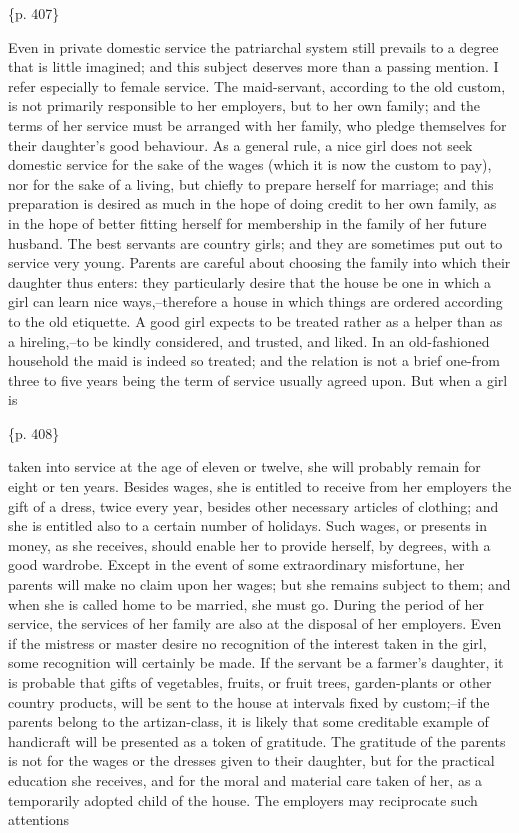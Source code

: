 \{p. 407\}

Even in private domestic service the patriarchal system still prevails to a degree that is little imagined; and this subject deserves more than a passing mention. I refer especially to female service. The maid-servant, according to the old custom, is not primarily responsible to her employers, but to her own family; and the terms of her service must be arranged with her family, who pledge themselves for their daughter's good behaviour. As a general rule, a nice girl does not seek domestic service for the sake of the wages (which it is now the custom to pay), nor for the sake of a living, but chiefly to prepare herself for marriage; and this preparation is desired as much in the hope of doing credit to her own family, as in the hope of better fitting herself for membership in the family of her future husband. The best servants are country girls; and they are sometimes put out to service very young. Parents are careful about choosing the family into which their daughter thus enters: they particularly desire that the house be one in which a girl can learn nice ways,--therefore a house in which things are ordered according to the old etiquette. A good girl expects to be treated rather as a helper than as a hireling,--to be kindly considered, and trusted, and liked. In an old-fashioned household the maid is indeed so treated; and the relation is not a brief one-from three to five years being the term of service usually agreed upon. But when a girl is

\{p. 408\}

taken into service at the age of eleven or twelve, she will probably remain for eight or ten years. Besides wages, she is entitled to receive from her employers the gift of a dress, twice every year, besides other necessary articles of clothing; and she is entitled also to a certain number of holidays. Such wages, or presents in money, as she receives, should enable her to provide herself, by degrees, with a good wardrobe. Except in the event of some extraordinary misfortune, her parents will make no claim upon her wages; but she remains subject to them; and when she is called home to be married, she must go. During the period of her service, the services of her family are also at the disposal of her employers. Even if the mistress or master desire no recognition of the interest taken in the girl, some recognition will certainly be made. If the servant be a farmer's daughter, it is probable that gifts of vegetables, fruits, or fruit trees, garden-plants or other country products, will be sent to the house at intervals fixed by custom;--if the parents belong to the artizan-class, it is likely that some creditable example of handicraft will be presented as a token of gratitude. The gratitude of the parents is not for the wages or the dresses given to their daughter, but for the practical education she receives, and for the moral and material care taken of her, as a temporarily adopted child of the house. The employers may reciprocate such attentions


